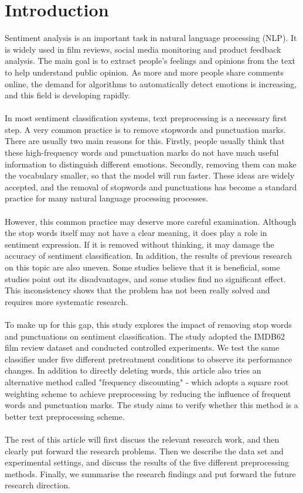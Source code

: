 \documentclass[a4paper,10pt]{article}
\begin{document}
\section{Introduction}
Sentiment analysis is an important task in natural language processing (NLP). It is widely used in film reviews, social media monitoring and product feedback analysis. The main goal is to extract people's feelings and opinions from the text to help understand public opinion. As more and more people share comments online, the demand for algorithms to automatically detect emotions is increasing, and this field is developing rapidly.\\ \\
In most sentiment classification systems, text preprocessing is a necessary first step. A very common practice is to remove stopwords and punctuation marks. There are usually two main reasons for this. Firstly, people usually think that these high-frequency words and punctuation marks do not have much useful information to distinguish different emotions. Secondly, removing them can make the vocabulary smaller, so that the model will run faster. These ideas are widely accepted, and the removal of stopwords and punctuations has become a standard practice for many natural language processing processes.\\ \\
However, this common practice may deserve more careful examination. Although the stop words itself may not have a clear meaning, it does play a role in sentiment expression. If it is removed without thinking, it may damage the accuracy of sentiment classification. In addition, the results of previous research on this topic are also uneven. Some studies believe that it is beneficial, some studies point out its disadvantages, and some studies find no significant effect. This inconsistency shows that the problem has not been really solved and requires more systematic research.\\ \\
To make up for this gap, this study explores the impact of removing stop words and punctuations on sentiment classification. The study adopted the IMDB62 film review dataset and conducted controlled experiments. We test the same classifier under five different pretreatment conditions to observe its performance changes. In addition to directly deleting words, this article also tries an alternative method called "frequency discounting" - which adopts a square root weighting scheme to achieve preprocessing by reducing the influence of frequent words and punctuation marks. The study aims to verify whether this method is a better text preprocessing scheme.\\ \\
The rest of this article will first discuss the relevant research work, and then clearly put forward the research problems. Then we describe the data set and experimental settings, and discuss the results of the five different preprocessing methods. Finally, we summarise the research findings and put forward the future research direction.
\end{document}
